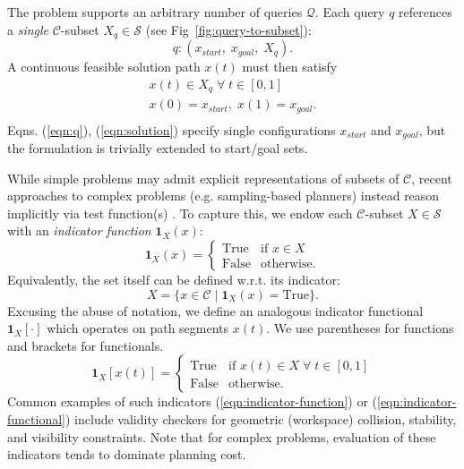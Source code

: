 \documentclass{report}
\begin{document}
The problem supports an arbitrary number of queries $\mathcal{Q}$.
Each query $q$ references a \emph{single}
$\mathcal{C}$-subset $X_q \in \mathcal{S}$
(see Fig~\ref{fig:query-to-subset}):
\begin{equation}
  q : ( x_{start},\; x_{goal},\; X_q ) .
  \label{eqn:q}
\end{equation}
A continuous feasible solution path $x(t)$ must then satisfy
\begin{equation}
  \begin{array}{c}
  x(t) \in X_q \;\forall\; t \in [0,1] \\
  x(0) = x_{start},\; x(1) = x_{goal} . \\
  \end{array}
  \label{eqn:solution}
\end{equation}
Eqns. (\ref{eqn:q}), (\ref{eqn:solution})
specify single configurations
$x_{start}$ and $x_{goal}$,
but the formulation is trivially extended to start/goal sets.

While simple problems may admit explicit representations of
subsets of $\mathcal{C}$,
recent approaches to complex problems
(e.g. sampling-based planners)
instead reason implicitly via test function(s)
\cite{lavalle2006planningbook}.
To capture this,
we endow each $\mathcal{C}$-subset $X \in \mathcal{S}$ with an
\emph{indicator function} $\mathbf{1}_X(x)$:
\begin{equation}
  \mathbf{1}_X(x) =
    \left\{ \begin{array}{ll}
      \mbox{True} & \mbox{if } x \in X \\
      \mbox{False} & \mbox{otherwise}.
    \end{array} \right.
  \label{eqn:indicator-function}
\end{equation}
Equivalently, the set itself can be defined w.r.t. its indicator:
\begin{equation}
  X = \{ x \in \mathcal{C} \;|\; \mathbf{1}_X(x) = \mbox{True} \} .
\end{equation}
Excusing the abuse of notation,
we define an analogous indicator functional $\mathbf{1}_X[\cdot]$
which operates on path segments $x(t)$.
We use parentheses for functions and brackets for functionals.
\begin{equation}
  \mathbf{1}_X[x(t)] =
    \left\{ \begin{array}{ll}
      \mbox{True} & \mbox{if } x(t) \in X \;\forall\; t \in [0,1] \\
      \mbox{False} & \mbox{otherwise}.
    \end{array} \right.
  \label{eqn:indicator-functional}
\end{equation}
Common examples of such indicators
(\ref{eqn:indicator-function}) or (\ref{eqn:indicator-functional})
include validity checkers for
geometric (workspace) collision,
stability, and visibility constraints.
Note that for complex problems,
evaluation of these indicators 
tends to dominate planning cost.
\end{document}
